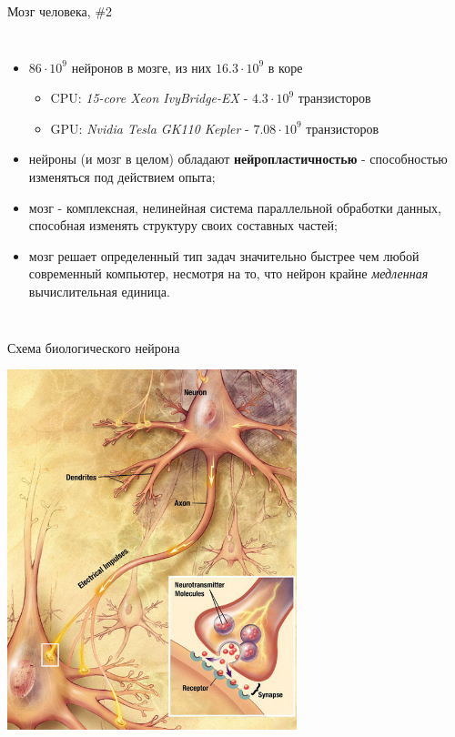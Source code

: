 \documentclass[10pt]{beamer}
\begin{document}
\begin{frame}{Мозг человека, \#2}
\begin{columns}
	\begin{itemize}
		\item $86\cdot10^9$ нейронов в мозге, из них $16.3\cdot10^9$ в коре
		\begin{itemize}
			\item CPU: \textit{15-core Xeon IvyBridge-EX} - $4.3\cdot10^9$ транзисторов
			\item GPU: \textit{Nvidia Tesla GK110 Kepler} - $7.08\cdot10^9$ транзисторов
		\end{itemize}
		\item нейроны (и мозг в целом) обладают \textbf{нейропластичностью} - способностью изменяться под действием опыта;
		\item мозг - комплексная, нелинейная система параллельной обработки данных, способная изменять структуру своих составных частей;
		\item мозг решает определенный тип задач значительно быстрее чем любой современный компьютер, несмотря на то, что нейрон крайне \textit{медленная} вычислительная единица.
	\end{itemize}	    
\end{columns}

\end{frame}


\begin{frame}{Схема биологического нейрона}

\centering
\includegraphics[width=0.63\textwidth]{images/Chemical_synapse_schema_cropped.jpg}

\end{frame}
\end{document}

